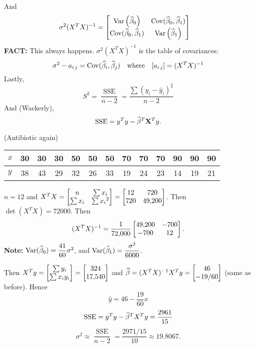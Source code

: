 And
\begin{align*}
    \sigma^2 (X^TX)^{-1} &= \begin{bmatrix}
        \Var{\betah_0} & \Cov (\betah_0, \betah_1)
        \\ \Cov (\betah_0, \betah_1)  & \Var{\betah_1}
    \end{bmatrix}
\end{align*}
\textbf{FACT:} This always happens. $\sigma^2 (X^TX)^{-1}$ is the table of covariances:
$$\sigma^2 - a_{i\,j} = \operatorname{Cov} (\widehat{\beta}_i, \widehat{\beta}_j) \quad \text{where} \quad [a_{i\,j}] = (X^TX)^{-1}$$
Lastly,
$$S^2 = \frac{\operatorname{SSE}}{n-2} = \frac{\displaystyle \sum (y_i - \widehat{y}_i)^2}{n-2}$$
And  (Wackerly),
$$\operatorname{SSE} = y^Ty - \widehat{\beta}^T \mathbf X^T y.$$

\example* (Antibiotic again)
\begin{center}
    \begin{tabular}{|l||c|c|c|c|c|c|c|c|c|c|c|c|} 
         \hline
         $x$ & 30 & 30 & 30 & 50 & 50 & 50 & 70 & 70 & 70 & 90 & 90 &90 \\
         \hline 
         $y$ & 38 & 43 & 29 & 32 & 26 & 33 & 19 & 24 & 23 & 14 & 19 & 21\\
         \hline
    \end{tabular}
\end{center}
$n = 12$ and $X^TX \displaystyle = \begin{bmatrix}{n} & {\sum x_i}\\{\sum x_i}&{\sum {x_i}^2}\end{bmatrix} = \begin{bmatrix}{12} & {720}\\{720}&{\num{49200}}\end{bmatrix}$. Then $\det (X^TX) = \num{72000}$. Then
$$(X^TX)^{-1} = \over{\num{72000}} \begin{bmatrix}
    \num{49200} & -700 \\ -700 & 12
\end{bmatrix}.$$
\setRed \textbf{Note:} \setBlack $\Var*{\betah_0} = \dfrac{41}{60}\sigma^2$, and $\Var*{\betah_1} = \dfrac{\sigma^2}{6000}$. 

\nl Then $X^Ty \displaystyle = \vvec*{\sum y_i}{\sum x_iy_i} = \vvec*{324}{\num{17540}}$ and $\betah = (X^TX)^{-1}X^Ty = \vvec*{46}{-19/60}$ (same as before). Hence 
$$\widehat{y} = 46 - \frac{19}{60}x$$
$$\operatorname{SSE} = y^Ty - \widehat{\beta}^T X^Ty = \frac{2961}{15}$$
$$\sigma^2 \approx \frac{\operatorname{SSE}}{n-2} = \frac{2971/15}{10} \approx 19.8067.$$
